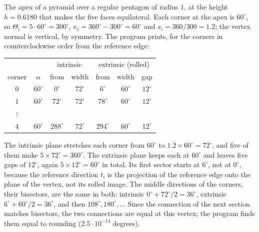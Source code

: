 \begin{example}
\label{ex:int_pyramid}
The apex of a pyramid over a regular pentagon of radius $1$, at the height $h = 0.6180$ that makes the five faces equilateral. Each corner at the apex is $60^\circ$, so $\Theta_i = 5\cdot 60^\circ = 300^\circ$, $\kappa_i = 360^\circ - 300^\circ = 60^\circ$ and $s_i = 360/300 = 1.2$; the vertex normal is vertical, by symmetry. The program prints, for the corners in counterclockwise order from the reference edge:
\begin{center}
\footnotesize
\begin{tabular}{c c | c c | c c c}
\toprule
& & \multicolumn{2}{c|}{intrinsic} & \multicolumn{3}{c}{extrinsic (rolled)} \\
corner & $\alpha$ & from & width & from & width & gap \\
\midrule
0 & $60^\circ$ & $0^\circ$ & $72^\circ$ & $6^\circ$ & $60^\circ$ & $12^\circ$ \\
1 & $60^\circ$ & $72^\circ$ & $72^\circ$ & $78^\circ$ & $60^\circ$ & $12^\circ$ \\
$\vdots$ & & & & & & \\
4 & $60^\circ$ & $288^\circ$ & $72^\circ$ & $294^\circ$ & $60^\circ$ & $12^\circ$ \\
\bottomrule
\end{tabular}
\end{center}
The intrinsic plane stretches each corner from $60^\circ$ to $1.2 \times 60^\circ = 72^\circ$, and five of them make $5 \times 72^\circ = 360^\circ$. The extrinsic plane keeps each at $60^\circ$ and leaves five gaps of $12^\circ$, again $5\times 12^\circ = 60^\circ$ in total. Its first sector starts at $6^\circ$, not at $0^\circ$, because the reference direction $t_i$ is the projection of the reference edge onto the plane of the vertex, not its rolled image. The middle directions of the corners, their bisectors, are the same in both: intrinsic $0^\circ + 72^\circ/2 = 36^\circ$, extrinsic $6^\circ + 60^\circ/2 = 36^\circ$, and then $108^\circ, 180^\circ, \ldots$ Since the connection of the next section matches bisectors, the two connections are equal at this vertex; the program finds them equal to rounding ($2.5 \cdot 10^{-14}$ degrees).
\end{example}

